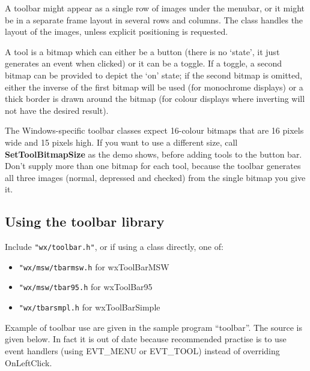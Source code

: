 A toolbar might appear as a single row of images under
the menubar, or it might be in a separate frame layout in several rows
and columns. The class handles the layout of the images, unless explicit
positioning is requested.

A tool is a bitmap which can either be a button (there is no `state',
it just generates an event when clicked) or it can be a toggle. If a
toggle, a second bitmap can be provided to depict the `on' state; if
the second bitmap is omitted, either the inverse of the first bitmap
will be used (for monochrome displays) or a thick border is drawn
around the bitmap (for colour displays where inverting will not have
the desired result).

The Windows-specific toolbar classes expect 16-colour bitmaps that are 16 pixels wide and 15 pixels
high. If you want to use a different size, call {\bf SetToolBitmapSize}\rtfsp
as the demo shows, before adding tools to the button bar. Don't supply more than
one bitmap for each tool, because the toolbar generates all three images (normal,
depressed and checked) from the single bitmap you give it.

\subsection{Using the toolbar library}\label{usingtoolbarlibrary}

Include {\tt "wx/toolbar.h"}, or if using a class directly, one of:

\begin{itemize}\itemsep=0pt
\item {\tt "wx/msw/tbarmsw.h} for wxToolBarMSW
\item {\tt "wx/msw/tbar95.h} for wxToolBar95
\item {\tt "wx/tbarsmpl.h} for wxToolBarSimple
\end{itemize}

Example of toolbar use are given in the sample program ``toolbar''. The
source is given below. In fact it is out of date because recommended
practise is to use event handlers (using EVT\_MENU or EVT\_TOOL) instead of
overriding OnLeftClick.

